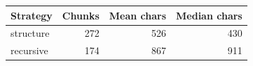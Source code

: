 \begin{tabular}{@{}lrrr@{}}
\toprule
Strategy & Chunks & Mean chars & Median chars \\
\midrule
structure & 272 & 526 & 430 \\
recursive & 174 & 867 & 911 \\
\bottomrule
\end{tabular}